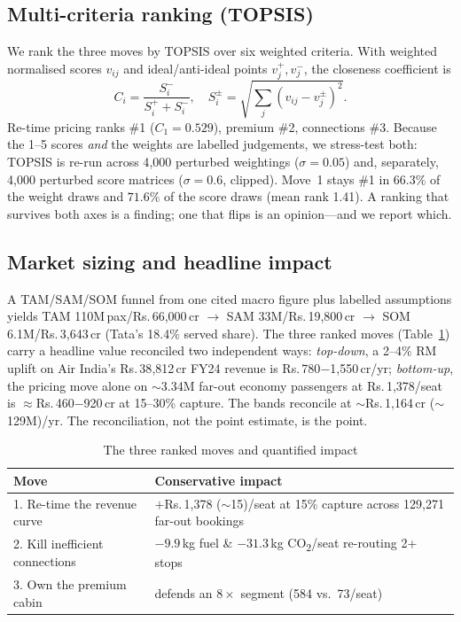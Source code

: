 \documentclass[conference]{IEEEtran}
\newcommand{\INR}{\mbox{Rs.}}
\newcommand{\EUR}{\texteuro}
\newcommand{\co}{\mbox{CO\textsubscript{2}}}
\newcommand{\cr}{\,cr}        %
\begin{document}
\subsection{Multi-criteria ranking (TOPSIS)}
We rank the three moves by TOPSIS over six weighted criteria. With weighted normalised scores $v_{ij}$ and ideal/anti-ideal points $v_j^{+},v_j^{-}$, the closeness coefficient is
\begin{equation}
C_i = \frac{S_i^{-}}{S_i^{+}+S_i^{-}},\quad
S_i^{\pm}=\sqrt{\textstyle\sum_j (v_{ij}-v_j^{\pm})^2}.
\label{eq:topsis}
\end{equation}
Re-time pricing ranks \#1 ($C_1=0.529$), premium \#2, connections \#3. Because the 1--5 scores \emph{and} the weights are labelled judgements, we stress-test both: TOPSIS is re-run across 4{,}000 perturbed weightings ($\sigma=0.05$) and, separately, 4{,}000 perturbed score matrices ($\sigma=0.6$, clipped). Move~1 stays \#1 in $66.3\%$ of the weight draws and $71.6\%$ of the score draws (mean rank 1.41). A ranking that survives both axes is a finding; one that flips is an opinion---and we report which.

\subsection{Market sizing and headline impact}
A TAM/SAM/SOM funnel from one cited macro figure plus labelled assumptions yields TAM 110M\,pax/\INR{}\,66{,}000\cr{} $\to$ SAM 33M/\INR{}\,19{,}800\cr{} $\to$ SOM 6.1M/\INR{}\,3{,}643\cr{} (Tata's 18.4\% served share). The three ranked moves (Table~\ref{tab:moves}) carry a headline value reconciled two independent ways: \emph{top-down}, a 2--4\% RM uplift on Air India's \INR{}\,38{,}812\cr{} FY24 revenue is \INR{}\,780$-$1{,}550\cr{}/yr; \emph{bottom-up}, the pricing move alone on $\sim$3.34M far-out economy passengers at \INR{}\,1{,}378/seat is $\approx$\INR{}\,460$-$920\cr{} at 15--30\% capture. The bands reconcile at $\sim$\INR{}\,1{,}164\cr{} ($\sim$\EUR{}129M)/yr. The reconciliation, not the point estimate, is the point.

\begin{table}[!t]
\caption{The three ranked moves and quantified impact}
\label{tab:moves}
\centering
\renewcommand{\arraystretch}{1.2}
\begin{tabular}{@{}p{2.5cm}p{5.0cm}@{}}
\toprule
\textbf{Move} & \textbf{Conservative impact}\\
\midrule
1. Re-time the revenue curve & $+$\INR{}\,1{,}378 ($\sim$\EUR{}15)/seat at 15\% capture across 129{,}271 far-out bookings\\
2. Kill inefficient connections & $-9.9$\,kg fuel \& $-31.3$\,kg \co{}/seat re-routing 2+ stops\\
3. Own the premium cabin & defends an $8\times$ segment (\EUR{}584 vs.\ \EUR{}73/seat)\\
\bottomrule
\end{tabular}
\end{table}
\end{document}
